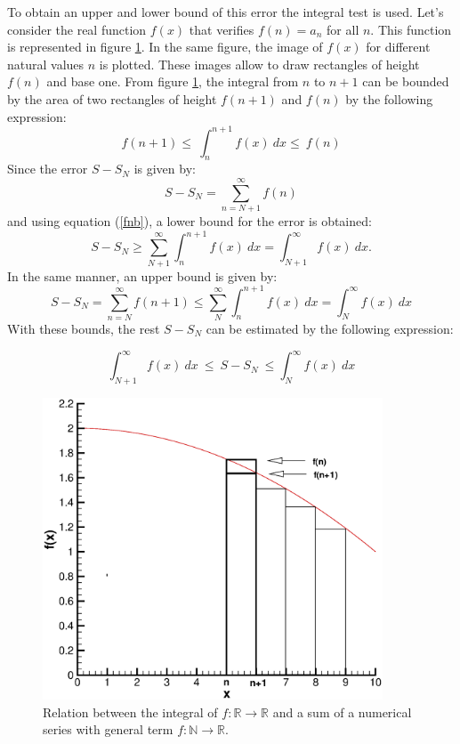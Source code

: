 To obtain an upper and lower bound of this error the integral test is used. 
Let's consider 
the real function $ f(x) $  that verifies $ f(n) = a_n $ for all $n$.   
This function is represented in figure \ref{fig:sn}. 
In the same figure, the image of $ f(x) $ for different natural values $ n $  
is plotted. These images allow to draw rectangles of height $ f(n)$ and base one. 
From figure  \ref{fig:sn}, 
the integral from $ n $ to $ n+1 $ can be bounded by the area of two rectangles of height $ f(n+1) $ and $ f(n) $ 
by the following expression:
\begin{equation} 
f(n+1) \le \ \int _{n} ^{n+1}  f(x) \ dx \le \ f(n) 
\label{fnb}
\end{equation} 
Since the  error $ S - S_N $ is given by:  
$$
S-S_N = \sum_{n=N+1} ^\infty f(n)
$$
and using equation (\ref{fnb}), a lower bound for the error is obtained: 
$$
S-S_N \ge \sum_{N+1}  ^\infty \int _{n} ^{n+1}  f(x) \ dx = 
\int _{N+1} ^{\infty}  f(x) \ dx.
$$
In the same manner, an upper bound is given by: 
$$
S-S_N = \sum_{n=N} ^\infty f(n+1) \le \sum_{N}  ^\infty \int _{n} ^{n+1}  f(x) \ dx = 
\int _{N} ^{\infty}  f(x) \ dx
$$
With these bounds, the rest $ S- S_N $ can be estimated by the following expression: 

\begin{equation}
  \int _{N+1} ^{\infty}  f(x) \ dx\  \le \ S -S_N \ \le \int _{N} ^{\infty}  f(x) \ dx
\label{error_SN}
\end{equation} 


\begin{figure}[h]
	\centering
	\includegraphics[width= 0.9\textwidth]{./doc/Figures/tecplot/snb}
	\caption{Relation between the integral of $ f:  \mathbb{R} \rightarrow \mathbb{R} $ and a sum of a numerical series with general term $ f 
	: \mathbb{N} \rightarrow \mathbb{R}$.}
	\label{fig:sn}
\end{figure}







